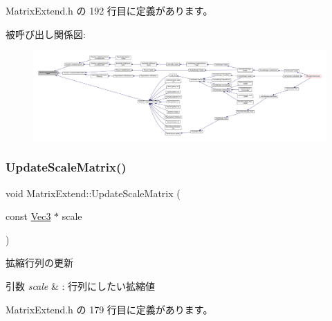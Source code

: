  Matrix\+Extend.\+h の 192 行目に定義があります。

被呼び出し関係図\+:
\nopagebreak
\begin{figure}[H]
\begin{center}
\leavevmode
\includegraphics[width=350pt]{class_matrix_extend_afa307701c3147fc345ed10dee054affb_icgraph}
\end{center}
\end{figure}
\mbox{\label{class_matrix_extend_afc536ab192cd6ef2b9a93861af5bf005}} 
\subsubsection{\texorpdfstring{Update\+Scale\+Matrix()}{UpdateScaleMatrix()}}
{\footnotesize\ttfamily void Matrix\+Extend\+::\+Update\+Scale\+Matrix (\begin{DoxyParamCaption}\item[{const \mbox{\hyperlink{_vector3_d_8h_ab16f59e4393f29a01ec8b9bbbabbe65d}{Vec3}} $\ast$}]{scale }\end{DoxyParamCaption})\hspace{0.3cm}{\ttfamily [inline]}}



拡縮行列の更新 


\begin{DoxyParams}{引数}
{\em scale} & \+: 行列にしたい拡縮値 \\
\hline
\end{DoxyParams}


 Matrix\+Extend.\+h の 179 行目に定義があります。

